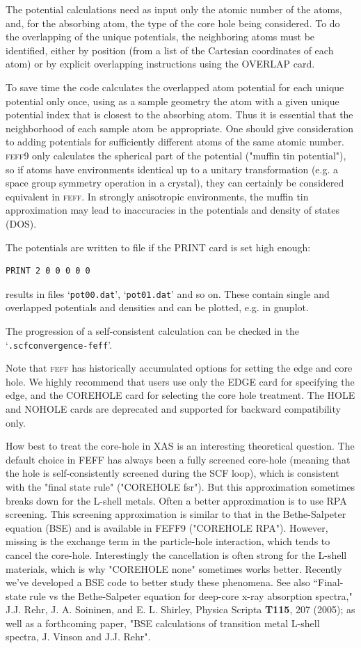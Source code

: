 \documentclass[11pt,oneside]{report} %
\newcommand{\program}[1]{\textsc{#1}}
\newcommand{\feff}{\program{feff}}
\newcommand{\vnum}{9}
\newcommand{\feffcur}{\feff\vnum}
\newcommand{\file}[1]{`\texttt{#1}'}
\begin{document}
The potential calculations need as input only the atomic number of the
atoms, and, for the absorbing atom, the type of the core hole being
considered. To do the overlapping of the unique potentials, the
neighboring atoms must be identified, either by position (from a list
of the Cartesian coordinates of each atom) or by explicit overlapping
instructions using the OVERLAP card.

To save time the code calculates the overlapped atom potential for each
unique potential only once, using as a sample geometry the atom with
a given unique potential index that is closest to the absorbing atom. 
Thus it is essential that the neighborhood of each sample atom be appropriate.
One should give consideration to adding potentials for sufficiently different atoms
of the same atomic number.  {\feffcur} only calculates the spherical part of the potential
("muffin tin potential"), so if atoms have environments identical up to a unitary transformation
(e.g. a space group symmetry operation in a crystal), they can certainly be considered equivalent
in {\feff}.  In strongly anisotropic environments, the muffin tin approximation may lead
to inaccuracies in the potentials and density of states (DOS). 

The potentials are written to file if the PRINT card is set high enough:
\begin{verbatim}
PRINT 2 0 0 0 0 0 
\end{verbatim}
results in files \file{pot00.dat}, \file{pot01.dat} and so on.  These contain single and overlapped potentials
and densities and can be plotted, e.g. in gnuplot.

The progression of a self-consistent calculation can be checked in the \file{.scfconvergence-feff}.

Note that {\feff} has historically accumulated options for setting the
edge and core hole.  We highly recommend that users use only the EDGE card for
specifying the edge, and the COREHOLE card for selecting the core hole treatment.
The HOLE and NOHOLE cards are deprecated and supported for backward compatibility only.

How best to treat the core-hole in XAS is an interesting theoretical question. The default choice in FEFF has always been a fully screened core-hole (meaning that the hole is self-consistently screened during the SCF loop), which is consistent with the "final state rule" ("COREHOLE fsr"). But this approximation sometimes breaks down for the L-shell metals. Often a better approximation is to use RPA screening.  This screening approximation is similar to that in the Bethe-Salpeter equation (BSE) and is available in FEFF9 ("COREHOLE RPA"). However, missing is the exchange term in the particle-hole interaction, which tends to cancel the core-hole. Interestingly the cancellation is often strong for the L-shell materials, which is why "COREHOLE none" sometimes works better. Recently we've developed a BSE code to better study these phenomena. See also ``Final-state rule vs the Bethe-Salpeter equation  for deep-core x-ray absorption spectra," J.J. Rehr, J. A. Soininen, and E. L. Shirley, Physica Scripta {\bf T115}, 207 (2005); as well as a forthcoming paper, "BSE calculations of transition metal L-shell spectra, J. Vinson and J.J. Rehr".
\end{document}

